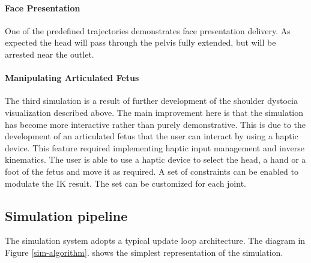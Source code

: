 \paragraph{Face Presentation}
One of the predefined trajectories demonstrates face presentation delivery. As expected the head will pass through the pelvis fully extended, but will be arrested near the outlet.

\paragraph{Manipulating Articulated Fetus}
The third simulation is a result of further development of the shoulder dystocia visualization described above. The main improvement here is that the simulation has become more interactive rather than purely demonstrative. This is due to the development of an articulated fetus that the user can interact by using a haptic device. This feature required implementing haptic input management and inverse kinematics. The user is able to use a haptic device to select the head, a hand or a foot of the fetus and move it as required. A set of constraints can be enabled to modulate the IK result. The set can be customized for each joint.

\subsection{Simulation pipeline}

The simulation system adopts a typical update loop architecture. The diagram in Figure \ref{sim-algorithm}. shows the simplest representation of the simulation.

